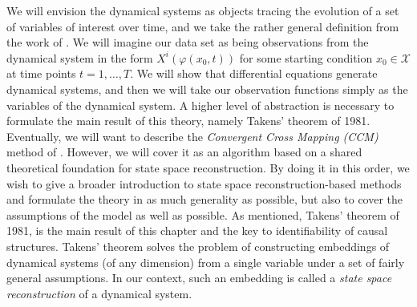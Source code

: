 \documentclass[11pt, a4paper]{memoir}
\theoremstyle{break}
\theoremstyle{break}
\theoremstyle{nonumberplain}
\begin{document}
We will envision the dynamical systems as objects tracing the evolution of a set of variables of interest over time, and we take the rather general definition from the work of \cite{inbook}. We will imagine our data set as being observations from the dynamical system in the form $X^i(\varphi(x_0,t))$ for some starting condition $x_0\in \mathcal{X}$ at time points $t=1,\ldots, T$. We will show that differential equations generate dynamical systems, and then we will take our observation functions simply as the variables of the dynamical system. A higher level of abstraction is necessary to formulate the main result of this theory, namely Takens' theorem of 1981.\\[5pt]
Eventually, we will want to describe the \textit{Convergent Cross Mapping (CCM)} method of \cite{Sugihara}. However, we will cover it as an algorithm based on a shared theoretical foundation for state space reconstruction. By doing it in this order, we wish to give a broader introduction to state space reconstruction-based methods and formulate the theory in as much generality as possible, but also to cover the assumptions of the model as well as possible. As mentioned, Takens' theorem of 1981, \cite{Takens} is the main result of this chapter and the key to identifiability of causal structures. Takens' theorem solves the problem of constructing embeddings of dynamical systems (of any dimension) from a single variable under a set of fairly general assumptions. In our context, such an embedding is called a \textit{state space reconstruction} of a dynamical system.
\end{document}
